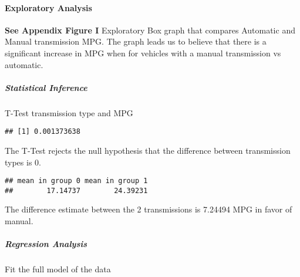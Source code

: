 \documentclass[]{article}
\newenvironment{Shaded}{\begin{snugshade}}{\end{snugshade}}
\newcommand{\CommentTok}[1]{\textcolor[rgb]{0.56,0.35,0.01}{\textit{#1}}}
\newcommand{\DataTypeTok}[1]{\textcolor[rgb]{0.13,0.29,0.53}{#1}}
\newcommand{\KeywordTok}[1]{\textcolor[rgb]{0.13,0.29,0.53}{\textbf{#1}}}
\newcommand{\NormalTok}[1]{#1}
\newcommand{\OperatorTok}[1]{\textcolor[rgb]{0.81,0.36,0.00}{\textbf{#1}}}
\newcommand{\StringTok}[1]{\textcolor[rgb]{0.31,0.60,0.02}{#1}}
\let\oldparagraph\paragraph
\renewcommand{\paragraph}[1]{\oldparagraph{#1}\mbox{}}
\let\oldsubparagraph\subparagraph
\renewcommand{\subparagraph}[1]{\oldsubparagraph{#1}\mbox{}}
\begin{document}
\hypertarget{exploratory-analysis}{%
\paragraph{Exploratory Analysis}\label{exploratory-analysis}}

\textbf{See Appendix Figure I} Exploratory Box graph that compares
Automatic and Manual transmission MPG. The graph leads us to believe
that there is a significant increase in MPG when for vehicles with a
manual transmission vs automatic.

\hypertarget{statistical-inference}{%
\subparagraph{Statistical Inference}\label{statistical-inference}}

T-Test transmission type and MPG

\begin{Shaded}
\end{Shaded}

\begin{verbatim}
## [1] 0.001373638
\end{verbatim}

The T-Test rejects the null hypothesis that the difference between
transmission types is 0.

\begin{Shaded}
\end{Shaded}

\begin{verbatim}
## mean in group 0 mean in group 1 
##        17.14737        24.39231
\end{verbatim}

The difference estimate between the 2 transmissions is 7.24494 MPG in
favor of manual.

\hypertarget{regression-analysis}{%
\subparagraph{Regression Analysis}\label{regression-analysis}}

Fit the full model of the data

\begin{Shaded}
\end{Shaded}
\end{document}
